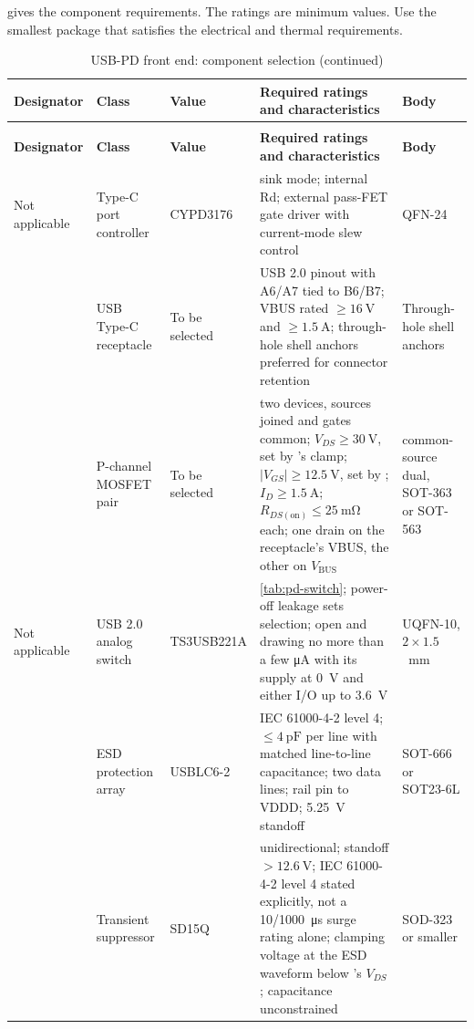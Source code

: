  gives the component requirements. The ratings are minimum
values. Use the smallest package that satisfies the electrical and thermal
requirements.

{\footnotesize
\begin{longtable}{|L{0.10\textwidth}|L{0.14\textwidth}|L{0.11\textwidth}|L{0.33\textwidth}|L{0.12\textwidth}|}
\caption{USB-PD front end: component selection}\label{tab:pd-parts}\\
\hline
\textbf{Designator} & \textbf{Class} & \textbf{Value} & \textbf{Required ratings and characteristics} & \textbf{Body} \\
\hline
\endfirsthead
\caption[]{USB-PD front end: component selection (continued)}\\
\hline
\textbf{Designator} & \textbf{Class} & \textbf{Value} & \textbf{Required ratings and characteristics} & \textbf{Body} \\
\hline
\endhead
\hline
\endlastfoot
Not applicable & Type-C port controller & CYPD3176 & sink mode; internal Rd; external pass-FET gate driver with current-mode slew control & QFN-24 \\
\hline
{} & USB Type-C receptacle & To be selected & USB 2.0 pinout with A6/A7 tied to B6/B7; VBUS rated $\geq\SI{16}{\volt}$ and $\geq\SI{1.5}{\ampere}$; through-hole shell anchors preferred for connector retention & Through-hole shell anchors \\
\hline
{} & P-channel MOSFET pair & To be selected & two devices, sources joined and gates common; $V_{DS}\geq\SI{30}{\volt}$, set by 's clamp; $|V_{GS}|\geq\SI{12.5}{\volt}$, set by ; $I_D\geq\SI{1.5}{\ampere}$; $R_{DS(\mathrm{on})}\leq\SI{25}{\milli\ohm}$ each; one drain on the receptacle's VBUS, the other on $V_{\mathrm{BUS}}$ & common-source dual, SOT-363 or SOT-563 \\
\hline
Not applicable & USB 2.0 analog switch & TS3USB221A & \cref{tab:pd-switch}; power-off leakage sets selection; open and drawing no more than a few \si{\micro\ampere} with its supply at \SI{0}{\volt} and either I/O up to \SI{3.6}{\volt} & UQFN-10, $2\times1.5$~\si{\milli\meter} \\
\hline
{} & ESD protection array & USBLC6-2 & IEC 61000-4-2 level 4; $\leq\SI{4}{\pico\farad}$ per line with matched line-to-line capacitance; two data lines; rail pin to VDDD; \SI{5.25}{\volt} standoff & SOT-666 or SOT23-6L \\
\hline
{} & Transient suppressor & SD15Q & unidirectional; standoff $>\SI{12.6}{\volt}$; IEC 61000-4-2 level 4 stated explicitly, not a 10/1000~\si{\micro\second} surge rating alone; clamping voltage at the ESD waveform below 's $V_{DS}$; capacitance unconstrained & SOD-323 or smaller \\

\end{longtable}}

